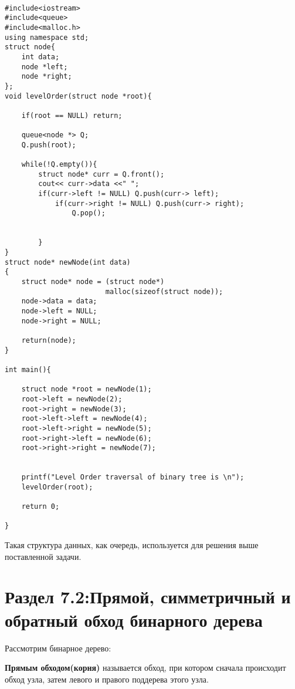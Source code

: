 \vspace{\baselineskip}
\vspace{-0.2cm}
\begin{tcolorbox}
\begin{verbatim}

#include<iostream>
#include<queue>
#include<malloc.h>
using namespace std;
struct node{
	int data;
	node *left;
	node *right;
};
void levelOrder(struct node *root){

	if(root == NULL) return;

	queue<node *> Q;
	Q.push(root);

	while(!Q.empty()){
		struct node* curr = Q.front();
		cout<< curr->data <<" ";
		if(curr->left != NULL) Q.push(curr-> left);
			if(curr->right != NULL) Q.push(curr-> right);
				Q.pop();


		}
}
struct node* newNode(int data)
{
	struct node* node = (struct node*)
						malloc(sizeof(struct node));
	node->data = data;
	node->left = NULL;
	node->right = NULL;

	return(node);
}

int main(){

	struct node *root = newNode(1);
	root->left = newNode(2);
	root->right = newNode(3);
	root->left->left = newNode(4);
	root->left->right = newNode(5);
	root->right->left = newNode(6);
	root->right->right = newNode(7);
	
	
	printf("Level Order traversal of binary tree is \n");
	levelOrder(root);

	return 0;

}

\end{verbatim}
\end{tcolorbox}

\vspace{\baselineskip}
\vspace{-0.3cm}
Такая структура данных, как очередь, используется для решения выше поставленной задачи.


\section*{Раздел 7.2:Прямой, симметричный и обратный обход \newline бинарного дерева}
Рассмотрим бинарное дерево:


\textbf{Прямым обходом(корня)} называется обход, при котором сначала происходит обход узла, затем левого и правого поддерева этого узла.

